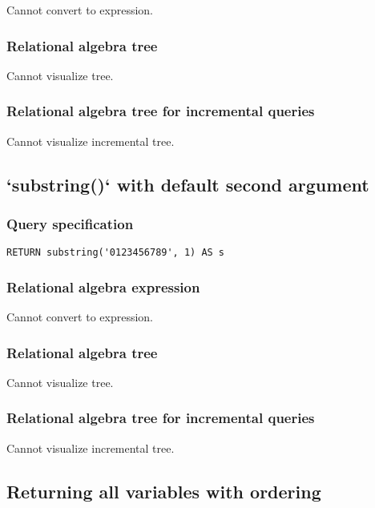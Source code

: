 Cannot convert to expression.

\subsubsection*{Relational algebra tree}

Cannot visualize tree.

\subsubsection*{Relational algebra tree for incremental queries}

Cannot visualize incremental tree.

\subsection{`substring()` with default second argument}

\subsubsection*{Query specification}

\begin{lstlisting}
RETURN substring('0123456789', 1) AS s
\end{lstlisting}

\subsubsection*{Relational algebra expression}

Cannot convert to expression.

\subsubsection*{Relational algebra tree}

Cannot visualize tree.

\subsubsection*{Relational algebra tree for incremental queries}

Cannot visualize incremental tree.

\subsection{Returning all variables with ordering}

